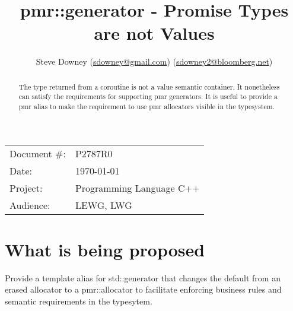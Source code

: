 \documentclass[a4paper,10pt,oneside,openany,final,article]{memoir}
\begin{document}
\title{pmr::generator - Promise Types are not Values}
\author{
  Steve Downey \small(\href{mailto:sdowney@gmail.com}{sdowney@gmail.com}) \small(\href{mailto:sdowney2@bloomberg.net}{sdowney2@bloomberg.net}) \\
}
\date{} %
\maketitle

\begin{flushright}
\begin{tabular}{ll}
Document \#: & P2787R0 \\
Date: & \today \\
Project: & Programming Language C++ \\
Audience: & LEWG, LWG
\end{tabular}
\end{flushright}

\begin{abstract}
  The type returned from a coroutine is not a value semantic container.
  It nonetheless can satisfy the requirements for supporting pmr generators.
  It is useful to provide a pmr alias to make the requirement to use pmr allocators visible in the typesystem.
\end{abstract}

\tableofcontents*

\chapter{What is being proposed}
Provide a template alias for std::generator that changes the default from an erased allocator to a pmr::allocator to facilitate enforcing business rules and semantic requirements in the typesytem.
\end{document}
